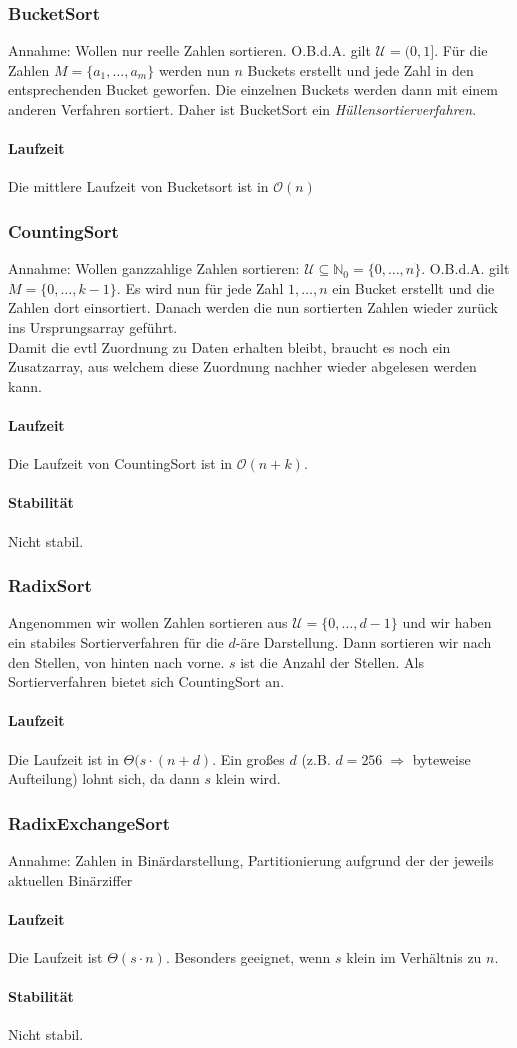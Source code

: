 \documentclass{scrartcl}
\begin{document}
\subsubsection{BucketSort}
Annahme: Wollen nur reelle Zahlen sortieren. O.B.d.A. gilt $\mathcal{U}=(0,1]$.
Für die Zahlen $M=\{a_1,\ldots,a_m\}$ werden nun $n$ Buckets erstellt und jede Zahl in den entsprechenden Bucket geworfen. Die einzelnen Buckets werden dann mit einem anderen Verfahren sortiert. Daher ist BucketSort ein \emph{Hüllensortierverfahren}.
\paragraph{Laufzeit}
Die mittlere Laufzeit von Bucketsort ist in $\mathcal{O}(n)$

\subsubsection{CountingSort}
Annahme: Wollen ganzzahlige Zahlen sortieren: $\mathcal{U}\subseteq\mathds N_0=\{0,\ldots,n\}$. O.B.d.A. gilt $M=\{0,\ldots,k-1\}$. Es wird nun für jede Zahl $1,\ldots,n$ ein Bucket erstellt und die Zahlen dort einsortiert. Danach werden die nun sortierten Zahlen wieder zurück ins Ursprungsarray geführt. \\
Damit die evtl Zuordnung zu Daten erhalten bleibt, braucht es noch ein Zusatzarray, aus welchem diese Zuordnung nachher wieder abgelesen werden kann.
\paragraph{Laufzeit}
Die Laufzeit von CountingSort ist in $\mathcal{O}(n+k)$.
\paragraph{Stabilität}
Nicht stabil.

\subsubsection{RadixSort}
Angenommen wir wollen Zahlen sortieren aus $\mathcal{U}=\{0,\ldots,d-1\}$ und wir haben ein stabiles Sortierverfahren für die $d$-äre Darstellung. Dann sortieren wir nach den Stellen, von hinten nach vorne. $s$ ist die Anzahl der Stellen. {\tiny Als Sortierverfahren bietet sich CountingSort an.}
\paragraph{Laufzeit}
Die Laufzeit ist in $\Theta(s\cdot(n+d)$. {\tiny Ein großes $d$ (z.B. $d=256 \; \Rightarrow$ byteweise Aufteilung) lohnt sich, da dann $s$ klein wird.}

\subsubsection{RadixExchangeSort}
Annahme: Zahlen in Binärdarstellung, Partitionierung aufgrund der der jeweils aktuellen Binärziffer
\paragraph{Laufzeit}
Die Laufzeit ist $\Theta(s\cdot n)$. Besonders geeignet, wenn $s$ klein im Verhältnis zu $n$.
\paragraph{Stabilität}
Nicht stabil.
\end{document}
